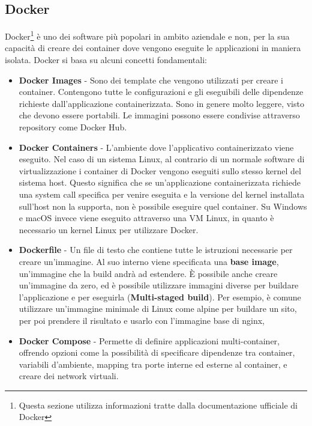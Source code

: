 \subsection{Docker}
Docker\footnote{Questa sezione utilizza informazioni tratte dalla documentazione ufficiale di Docker\cite{dockerdocs}}
\`e uno dei software pi\`u popolari in ambito aziendale e non, per la sua capacit\`a di creare dei container dove vengono eseguite le applicazioni in maniera isolata.
Docker si basa su alcuni concetti fondamentali:
\begin{itemize}
  \item \textbf{Docker Images} - Sono dei template che vengono utilizzati per creare i container. Contengono tutte le configurazioni e gli eseguibili delle dipendenze richieste
    dall'applicazione containerizzata. Sono in genere molto leggere, visto che devono essere portabili. Le immagini possono essere condivise attraverso repository come Docker Hub.
  \item \textbf{Docker Containers} - L'ambiente dove l'applicativo containerizzato viene eseguito. Nel caso di un sistema Linux, al contrario di un normale software di virtualizzazione
    i container di Docker vengono eseguiti sullo stesso kernel del sistema host. Questo significa che se un'applicazione containerizzata richiede una system call specifica
    per venire eseguita e la versione del kernel installata sull'host non la supporta, non \`e possibile eseguire quel container. Su Windows e macOS invece viene eseguito
    attraverso una VM Linux, in quanto \`e necessario un kernel Linux per utilizzare Docker.
  \item \textbf{Dockerfile} - Un file di testo che contiene tutte le istruzioni necessarie per creare un'immagine. Al suo interno viene specificata una \textbf{base image},
    un'immagine che la build andr\`a ad estendere. \`E possibile anche creare un'immagine da zero, ed \`e possibile utilizzare immagini diverse per buildare l'applicazione e per eseguirla
    (\textbf{Multi-staged build}). Per esempio, \`e comune utilizzare un'immagine minimale di Linux come alpine per buildare un sito, per poi prendere il risultato e usarlo con
    l'immagine base di nginx,
  \item \textbf{Docker Compose} - Permette di definire applicazioni multi-container, offrendo opzioni come la possibilit\`a di specificare dipendenze tra container, variabili d'ambiente,
    mapping tra porte interne ed esterne al container, e creare dei network virtuali.
\end{itemize}

